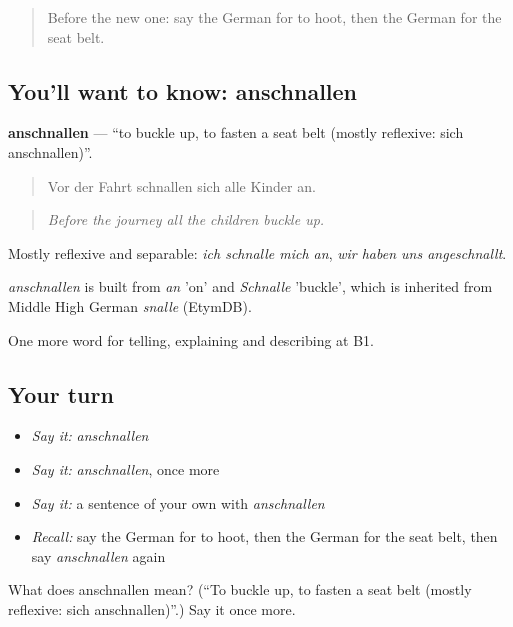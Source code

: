 \begin{quote}
Before the new one: say the German for to hoot, then the German for the seat belt.
\end{quote}

\subsection*{You'll want to know: anschnallen}
\textbf{anschnallen} — \textquotedblleft{}to buckle up, to fasten a seat belt (mostly reflexive: sich anschnallen)\textquotedblright{}.

\begin{quote}
Vor der Fahrt schnallen sich alle Kinder an.
\end{quote}

\begin{quote}
\emph{Before the journey all the children buckle up.}
\end{quote}

Mostly reflexive and separable: \emph{ich schnalle mich an}, \emph{wir haben uns angeschnallt}.

\begin{cousinweb}
\emph{anschnallen} is built from \emph{an} 'on' and \emph{Schnalle} 'buckle', which is inherited from Middle High German \emph{snalle} (EtymDB).
\end{cousinweb}

\begin{grammarlens}[title={What you've built}]
One more word for telling, explaining and describing at B1.
\end{grammarlens}

\subsection*{Your turn}
\begin{itemize}
\raggedright
  \item \emph{Say it:} \emph{anschnallen}
  \item \emph{Say it:} \emph{anschnallen}, once more
  \item \emph{Say it:} a sentence of your own with \emph{anschnallen}
  \item \emph{Recall:} say the German for to hoot, then the German for the seat belt, then say \emph{anschnallen} again
\end{itemize}

\begin{tcolorbox}[breakable,colback=teal!4,colframe=teal!35!black,title={Before you move on}]
What does anschnallen mean? (\textquotedblleft{}To buckle up, to fasten a seat belt (mostly reflexive: sich anschnallen)\textquotedblright{}.) Say it once more.
\end{tcolorbox}
